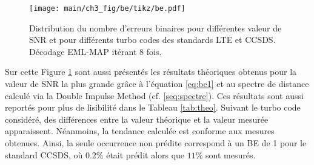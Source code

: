 \begin{figure}[!ht]
	\centering
	\hspace*{-1cm}
	\texttt{[image: main/ch3\_fig/be/tikz/be.pdf]}
	\caption{Distribution du nombre d'erreurs binaires pour différentes valeur de SNR et pour différents turbo codes des 
	standards LTE et CCSDS. 
	Décodage EML-MAP itérant 8 fois. \label{fig:be}}
\end{figure}

Sur cette Figure \ref{fig:be} sont aussi présentés les résultats théoriques obtenus pour la valeur de SNR la plus grande
grâce à l'équation \ref{eq:be1} et au spectre de distance calculé via la Double Impulse Method (cf. \ref{seq:spectre}).
Ces résultats sont aussi reportés pour plus de lisibilité dans le Tableau \ref{tab:theo}. Suivant le turbo code considéré,
des différences entre la valeur théorique et la valeur mesurée apparaissent. Néanmoins, la tendance calculée est conforme
aux mesures obtenues. Ainsi, la seule occurrence non prédite correspond à un BE de 1 pour le standard CCSDS, où $0.2\%$ 
était prédit alors que $11\%$ sont mesurés.

\begin{table}[]
\centering
\caption{Distribution théorique des erreurs dans le plancher d'erreur selon l'équation \ref{eq:be1} pour plusieurs turbo 
codes standardisés}
\label{tab:theo}
\end{table}

